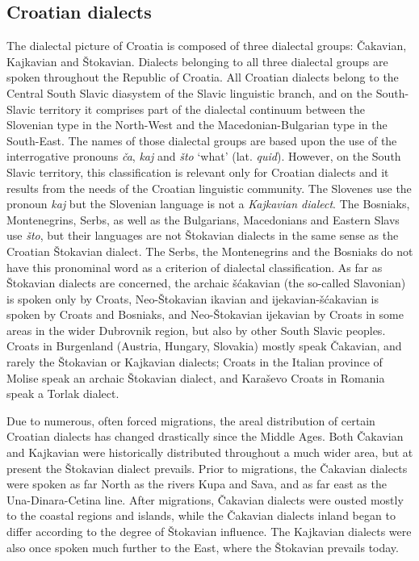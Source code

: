 \begin{multicols}{2}
\subsection{Croatian dialects}

The dialectal picture of Croatia is composed of three dialectal groups: Čakavian, Kajkavian and Štokavian. Dialects belonging to all three dialectal groups are spoken throughout the Republic of Croatia. All Croatian dialects belong to the Central South Slavic diasystem of the Slavic linguistic branch, and on the South-Slavic territory it comprises part of the dialectal continuum between the Slovenian type in the North-West and the Macedonian-Bulgarian type in the South-East. The names of those dialectal groups are based upon the use of the interrogative pronouns \emph{ča}, \emph{kaj} and \emph{što} ‘what’ (lat. \emph{quid}). However, on the South Slavic territory, this classification is relevant only for Croatian dialects and it results from the needs of the Croatian linguistic community. The Slovenes use the pronoun \emph{kaj} but the Slovenian language is not a \emph{Kajkavian dialect}. The Bosniaks, Montenegrins, Serbs, as well as the Bulgarians, Macedonians and Eastern Slavs use \emph{što}, but their languages are not Štokavian dialects in the same sense as the Croatian Štokavian dialect. The Serbs, the Montenegrins and the Bosniaks do not have this pronominal word as a criterion of dialectal classification. As far as Štokavian dialects are concerned, the archaic šćakavian (the so-called Slavonian) is spoken only by Croats, Neo-Štokavian ikavian and ijekavian-šćakavian is spoken by Croats and Bosniaks, and Neo-Štokavian ijekavian by Croats in some areas in the wider Dubrovnik region, but also by other South Slavic peoples. Croats in Burgenland (Austria, Hungary, Slovakia) mostly speak Čakavian, and rarely the Štokavian or Kajkavian dialects; Croats in the Italian province of Molise speak an archaic Štokavian dialect, and Karaševo Croats in Romania speak a Torlak dialect.

Due to numerous, often forced migrations, the areal distribution of certain Croatian dialects has changed drastically since the Middle Ages. Both Čakavian and Kajkavian were historically distributed throughout a much wider area, but at present the Štokavian dialect prevails. Prior to migrations, the Čakavian dialects were spoken as far North as the rivers Kupa and Sava, and as far east as the Una-Dinara-Cetina line. After migrations, Čakavian dialects were ousted mostly to the coastal regions and islands, while the Čakavian dialects inland began to differ according to the degree of Štokavian influence. The Kajkavian dialects were also once spoken much further to the East, where the Štokavian prevails today.


\end{multicols}
